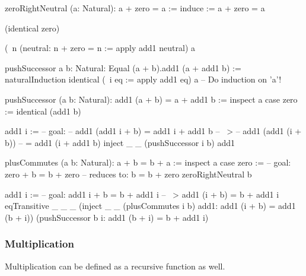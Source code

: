 \begin{alba}
    zeroRightNeutral (a: Natural): a + zero = a :=
        induce
            {\a := a + zero = a}

            (identical zero)

            (\ n (neutral: n + zero = n :=
                apply add1 neutral)
            a
\end{alba}



\begin{alba}
    pushSuccessor {a b: Natural}: Equal (a + b).add1  (a + add1 b) :=
        naturalInduction
            identical
            (\ {i} eq := apply add1 eq)
            {a}         -- Do induction on 'a'!

    pushSuccessor (a b: Natural): add1 (a + b) = a + add1 b :=
        inspect a case
            zero :=
                identical (add1 b)

            add1 i :=
                -- goal:
                --   add1 (add1 i + b) = add1 i + add1 b
                -- ~>
                --   add1 (add1 (i + b))
                --   = add1 (i + add1 b)
                inject _ _
                    (pushSuccessor i b)
                    add1
\end{alba}



\begin{alba}
    plusCommutes (a b: Natural): a + b = b + a :=
        inspect a case
            zero :=
                -- goal: zero + b = b + zero
                -- reduces to: b = b + zero
                zeroRightNeutral b

            add1 i :=
                -- goal: add1 i + b = b + add1 i
                -- ~>    add1 (i + b) = b + add1 i
                eqTransitive
                    _ _ _
                    (inject _ _ (plusCommutes i b) add1:
                        add1 (i + b) = add1 (b + i))
                    (pushSuccessor b i:
                        add1 (b + i) =  b + add1 i)
\end{alba}







\subsubsection{Multiplication}



Multiplication can be defined as a recursive function as well.


